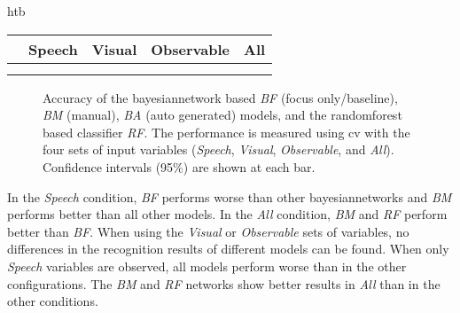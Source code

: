 \begin{colored_table}{htb}
    \centering
    \DTLsetseparator{,}  
    \begin{tabulary}{\textwidth}{C C C C C}
    \toprule
     & Speech & Visual & Observable & All
    \\
    \bottomrule
    \end{tabulary}
    \caption[One vs. all cross validation values.]{\label{fig:study-addressee-bn-cv-val} 
    Accuracy with 95\% confidence interval of the \gls{bayesiannetwork} based \emph{BF} (focus only/baseline), \emph{BM} (manual), \emph{BA} (auto generated) models, and the \gls{randomforest} based classifier \emph{RF}.
    The performance is measured using \gls{cv} with the four sets of input variables (\emph{Speech}, \emph{Visual}, \emph{Observable}, and \emph{All}).
    }
\end{colored_table}

\begin{figure}[tbh]
  \centering
  
    \caption[One vs. all cross validation results.]{\label{fig:study-addressee-bn-cv} 
    Accuracy of the \gls{bayesiannetwork} based \emph{BF} (focus only/baseline), \emph{BM} (manual), \emph{BA} (auto generated) models, and the \gls{randomforest} based classifier \emph{RF}.
    The performance is measured using \gls{cv} with the four sets of input variables (\emph{Speech}, \emph{Visual}, \emph{Observable}, and \emph{All}). Confidence intervals (95\%) are shown at each bar.
    }
\end{figure}

In the \emph{Speech} condition, \emph{BF} performs worse than other \glspl{bayesiannetwork} and \emph{BM} performs better than all other models.
In the \emph{All} condition, \emph{BM} and \emph{RF} perform better than \emph{BF}.
When using the \emph{Visual} or \emph{Observable} sets of variables, no differences in the recognition results of different models can be found.
When only \emph{Speech} variables are observed, all models perform worse than in the other configurations.
The \emph{BM} and \emph{RF} networks show better results in \emph{All} than in the other conditions.

